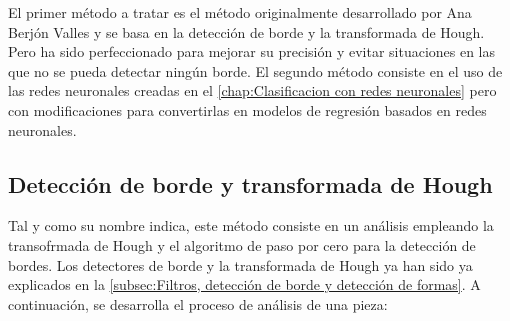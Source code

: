 El primer método a tratar es el método originalmente desarrollado por Ana Berjón Valles \citep{TFGAna} y se basa en la detección de borde y la transformada de Hough. Pero ha sido perfeccionado para mejorar su precisión y evitar situaciones en las que no se pueda detectar ningún borde. El segundo método consiste en el uso de las redes neuronales creadas en el \autoref{chap:Clasificacion con redes neuronales} pero con modificaciones para convertirlas en modelos de regresión basados en redes neuronales.

\subsection{Detección de borde y transformada de Hough}
Tal y como su nombre indica, este método consiste en un análisis empleando la transofrmada de Hough y el algoritmo de paso por cero para la detección de bordes. Los detectores de borde y la transformada de Hough ya han sido ya explicados en la \autoref{subsec:Filtros, detección de borde y detección de formas}. A continuación, se desarrolla el proceso de análisis de una pieza:

